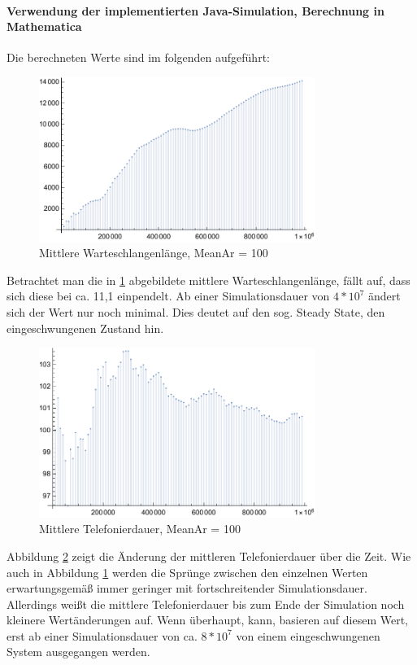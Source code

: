 \paragraph{Verwendung der implementierten Java-Simulation, Berechnung in Mathematica}
Die berechneten Werte sind im folgenden aufgeführt:

\begin{figure}[htpb]
	\centering
	\includegraphics[width=0.8\textwidth]{abbildungen/auswertung100/meanQueueTimePlot.pdf}
	\caption{Mittlere Warteschlangenlänge, MeanAr = 100}
	\label{fig:meanQueueTime100}
\end{figure}
Betrachtet man die in \ref{fig:meanQueueTime100} abgebildete mittlere Warteschlangenlänge, fällt auf, dass sich diese bei ca. 11,1 einpendelt. Ab einer Simulationsdauer von $4*10^7$ ändert sich der Wert nur noch minimal. Dies deutet auf den sog. \glqq Steady State\grqq, den eingeschwungenen Zustand hin.

\begin{figure}[htpb]
	\centering
	\includegraphics[width=0.8\textwidth]{abbildungen/auswertung100/meanCallingTimePlot.pdf}
	\caption{Mittlere Telefonierdauer, MeanAr = 100}
	\label{fig:meanCallingTime100}
\end{figure}

Abbildung \ref{fig:meanCallingTime100} zeigt die Änderung der mittleren Telefonierdauer über die Zeit. Wie auch in Abbildung \ref{fig:meanQueueTime100} werden die Sprünge zwischen den einzelnen Werten erwartungsgemäß immer geringer mit fortschreitender Simulationsdauer. Allerdings weißt die mittlere Telefonierdauer bis zum Ende der Simulation noch kleinere Wertänderungen auf. Wenn überhaupt, kann, basieren auf diesem Wert, erst ab einer Simulationsdauer von ca. $8*10^7$ von einem eingeschwungenen System ausgegangen werden.

